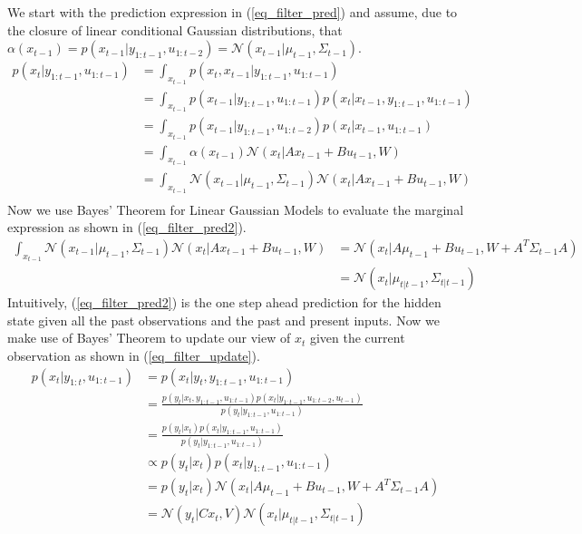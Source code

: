 We start with the prediction expression in (\ref{eq_filter_pred}) and assume, due to the closure of linear conditional Gaussian distributions, that $\alpha(x_{t-1}) = p(x_{t-1}|y_{1:t-1}, u_{1:t-2}) = \mathcal{N}(x_{t-1}|\mu_{t-1}, \Sigma_{t-1}) $. 
\begin{equation}
\begin{aligned}
p(x_t|y_{1:t-1}, u_{1:t-1}) &= \int_{x_{t-1}} p(x_t,x_{t-1}|y_{1:t-1}, u_{1:t-1}) \\
&= \int_{x_{t-1}} p(x_{t-1}|y_{1:t-1}, u_{1:t-1})p(x_{t}|x_{t-1}, y_{1:t-1}, u_{1:t-1}) \\
&= \int_{x_{t-1}} p(x_{t-1}|y_{1:t-1}, u_{1:t-2})p(x_{t}|x_{t-1}, u_{1:t-1}) \\
&= \int_{x_{t-1}} \alpha(x_{t-1})\mathcal{N}(x_{t}|Ax_{t-1}+Bu_{t-1}, W) \\
&= \int_{x_{t-1}} \mathcal{N}(x_{t-1}|\mu_{t-1}, \Sigma_{t-1}) \mathcal{N}(x_{t}|Ax_{t-1}+Bu_{t-1}, W) \\
\end{aligned}
\label{eq_filter_pred}
\end{equation} 
Now we use Bayes' Theorem for Linear Gaussian Models to evaluate the marginal expression as shown in (\ref{eq_filter_pred2}).
\begin{equation}
\begin{aligned}
\int_{x_{t-1}} \mathcal{N}(x_{t-1}|\mu_{t-1}, \Sigma_{t-1}) \mathcal{N}(x_{t}|Ax_{t-1}+Bu_{t-1}, W) &= \mathcal{N}(x_t|A\mu_{t-1}+Bu_{t-1
}, W+ A^T\Sigma_{t-1}A) \\
&= \mathcal{N}(x_t|\mu_{t|t-1},\Sigma_{t|t-1})
\end{aligned}
\label{eq_filter_pred2}
\end{equation}
Intuitively, (\ref{eq_filter_pred2}) is the one step ahead prediction for the hidden state given all the past observations and the past and present inputs. Now we make use of Bayes' Theorem to update our view of $x_t$ given the current observation as shown in (\ref{eq_filter_update}).
\begin{equation}
\begin{aligned}
p(x_t|y_{1:t},u_{1:t-1}) &= p(x_t|y_{t},y_{1:t-1},u_{1:t-1}) \\
&= \frac{p(y_t|x_t,y_{1:t-1},u_{1:t-1})p(x_t|y_{1:t-1},u_{1:t-2}, u_{t-1})}{p(y_t|y_{1:t-1},u_{1:t-1})} \\
&= \frac{p(y_t|x_t)p(x_t|y_{1:t-1},u_{1:t-1})}{p(y_t|y_{1:t-1},u_{1:t-1})} \\
&\propto p(y_t|x_t)p(x_t|y_{1:t-1},u_{1:t-1})\\
&= p(y_t|x_t)\mathcal{N}(x_t|A\mu_{t-1}+Bu_{t-1
}, W+ A^T\Sigma_{t-1}A) \\
&= \mathcal{N}(y_{t}|Cx_{t}, V)\mathcal{N}(x_t|\mu_{t|t-1},\Sigma_{t|t-1})
\end{aligned}
\label{eq_filter_update}
\end{equation}
